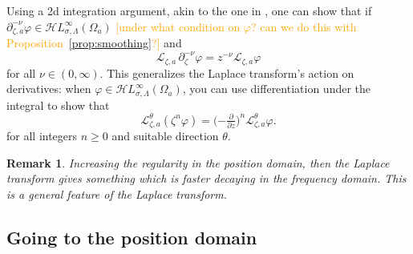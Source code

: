 \documentclass{article}
\theoremstyle{plain}
\newtheorem{rmk}{Remark}
\newcommand{\R}{\mathbb{R}}
\newcommand{\laplace}{\mathcal{L}}
\newcommand{\fracderiv}[3]{\partial^{#1}_{#2, #3}}
\newcommand{\singexp}[2]{\mathcal{H}L^\infty_{#1, #2}}
\begin{document}



Using a 2d integration argument, akin to the one in \cite[Theorem~2.39]{laplace-tfm}, one can show that if $\partial^{-\nu}_{\zeta,a} \varphi \in \singexp{\sigma}{\Lambda}(\Omega_a)$ \textcolor{orange}{[under what condition on $\varphi$? can we do this with Proposition~\ref{prop:smoothing}?]} and
\[ \laplace_{\zeta,a}\,\partial^{-\nu}_{\zeta} \varphi = z^{-\nu} \laplace_{\zeta, a} \varphi \]
for all $\nu \in (0, \infty)$. This generalizes the Laplace transform's action on derivatives: when $\varphi \in \singexp{\sigma}{\Lambda}(\Omega_a)$, you can use differentiation under the integral to show that~\cite[Theorem~1.34]{laplace-tfm}
\begin{equation}%
\laplace_{\zeta,a}^\theta (\zeta^n \varphi) = \big({-\tfrac{\partial}{\partial z}}\big)^n \laplace_{\zeta,a}^\theta \varphi.
\end{equation}
for all integers $n \ge 0$ and suitable direction $\theta$.

\begin{rmk}
    Increasing the regularity in the position domain, then the Laplace transform gives something which is faster decaying in the frequency domain. This is a general feature of the Laplace transform.
\end{rmk}

\subsection{Going to the position domain}
\end{document}

